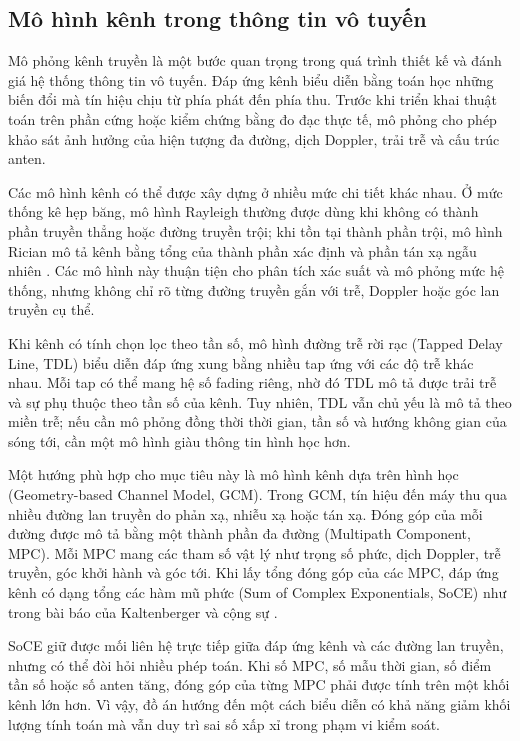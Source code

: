 \setcounter{section}{1}
\label{chap:problem_dps}

\subsection{Mô hình kênh trong thông tin vô tuyến}
\label{subsec:ch1_context}

Mô phỏng kênh truyền là một bước quan trọng trong quá trình thiết kế và đánh giá hệ thống thông tin vô tuyến. Đáp ứng kênh biểu diễn bằng toán học những biến đổi mà tín hiệu chịu từ phía phát đến phía thu. Trước khi triển khai thuật toán trên phần cứng hoặc kiểm chứng bằng đo đạc thực tế, mô phỏng cho phép khảo sát ảnh hưởng của hiện tượng đa đường, dịch Doppler, trải trễ và cấu trúc anten.

Các mô hình kênh có thể được xây dựng ở nhiều mức chi tiết khác nhau. Ở mức thống kê hẹp băng, mô hình Rayleigh thường được dùng khi không có thành phần truyền thẳng hoặc đường truyền trội; khi tồn tại thành phần trội, mô hình Rician mô tả kênh bằng tổng của thành phần xác định và phần tán xạ ngẫu nhiên \cite{Goldsmith2005}. Các mô hình này thuận tiện cho phân tích xác suất và mô phỏng mức hệ thống, nhưng không chỉ rõ từng đường truyền gắn với trễ, Doppler hoặc góc lan truyền cụ thể.

Khi kênh có tính chọn lọc theo tần số, mô hình đường trễ rời rạc (Tapped Delay Line, TDL) biểu diễn đáp ứng xung bằng nhiều tap ứng với các độ trễ khác nhau. Mỗi tap có thể mang hệ số fading riêng, nhờ đó TDL mô tả được trải trễ và sự phụ thuộc theo tần số của kênh. Tuy nhiên, TDL vẫn chủ yếu là mô tả theo miền trễ; nếu cần mô phỏng đồng thời thời gian, tần số và hướng không gian của sóng tới, cần một mô hình giàu thông tin hình học hơn.

Một hướng phù hợp cho mục tiêu này là mô hình kênh dựa trên hình học (Geometry-based Channel Model, GCM). Trong GCM, tín hiệu đến máy thu qua nhiều đường lan truyền do phản xạ, nhiễu xạ hoặc tán xạ. Đóng góp của mỗi đường được mô tả bằng một thành phần đa đường (Multipath Component, MPC). Mỗi MPC mang các tham số vật lý như trọng số phức, dịch Doppler, trễ truyền, góc khởi hành và góc tới. Khi lấy tổng đóng góp của các MPC, đáp ứng kênh có dạng tổng các hàm mũ phức (Sum of Complex Exponentials, SoCE) như trong bài báo của Kaltenberger và cộng sự \cite{Kaltenberger2007}.

SoCE giữ được mối liên hệ trực tiếp giữa đáp ứng kênh và các đường lan truyền, nhưng có thể đòi hỏi nhiều phép toán. Khi số MPC, số mẫu thời gian, số điểm tần số hoặc số anten tăng, đóng góp của từng MPC phải được tính trên một khối kênh lớn hơn. Vì vậy, đồ án hướng đến một cách biểu diễn có khả năng giảm khối lượng tính toán mà vẫn duy trì sai số xấp xỉ trong phạm vi kiểm soát.


